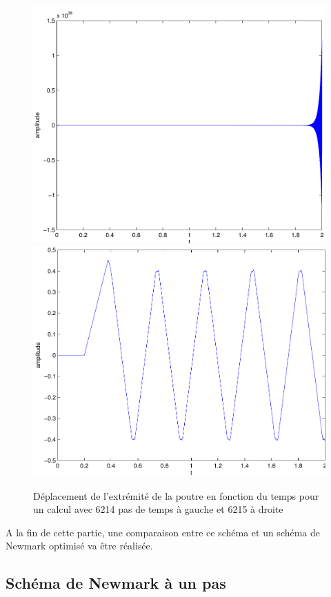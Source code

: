\documentclass[]{article}
\begin{document}
\begin{figure}
\begin{center}
 \includegraphics[scale=0.42]{Figures/depldifcendiv.pdf}
\includegraphics[scale=0.42]{Figures/depldifcenconv.pdf}
\caption{Déplacement de l'extrémité de la poutre en fonction du temps pour un
calcul avec 6214 pas de temps à gauche et 6215 à droite}
\label{convdiv}
\end{center}
\end{figure}
A la fin de cette partie, une comparaison entre ce schéma et un schéma de
Newmark optimisé va être réalisée.

\subsection{Schéma de Newmark à un pas}
\end{document}
